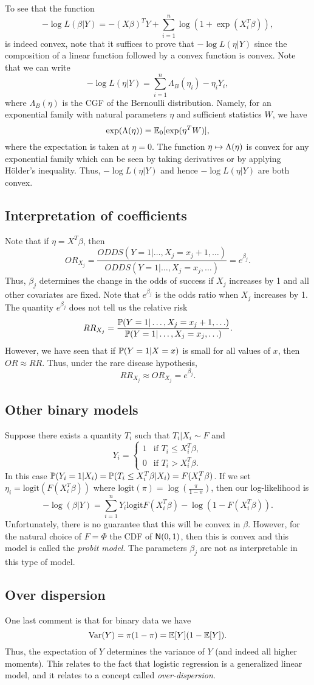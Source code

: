 To see that the function 
\[-\log L(\beta|Y)  = -(X\beta)^TY +\sum_{i=1}^n \log(1+\exp(X_i^T\beta)),\]
is indeed convex, note that it suffices to prove that $-\log L(\eta |Y)$ since the composition of a linear function followed by a convex function is convex. Note that we can write
\[-\log L(\eta|Y) = \sum_{i=1}^n \Lambda_B(\eta_i)-\eta_i Y_i, \]
where $\Lambda_B(\eta)$ is the CGF of the Bernoulli distribution. Namely, for an exponential family with natural parameters $\eta$ and sufficient statistics $W$, we have
\[\exp(\Lambda(\eta)) = {\mathbb{E}}_0[\exp(\eta^T W)], \]
where the expectation is taken at $\eta = 0$. The function $\eta \mapsto \Lambda(\eta)$ is convex for any exponential family which can be seen by taking derivatives or by applying H\"older's inequality. Thus, $-\log L(\eta|Y)$ and hence $-\log L(\eta|Y)$ are both convex.
\subsection{Interpretation of coefficients}
Note that if $\eta = X^T \beta$, then 
\[OR_{X_j} = \frac{ODDS(Y=1|\ldots, X_j = x_j+1,\ldots)}{ODDS(Y=1|\ldots, X_j = x_j,\ldots)} = e^{\beta_j}. \]
Thus, $\beta_j$ determines the change in the odds of success if $X_j$ increases by 1 and all other covariates are fixed. Note that $e^{\beta_j}$ is the odds ratio when $X_j$ increases by 1. The quantity $e^{\beta_j}$ does not tell us the relative risk 
\[RR_{X_j} =\frac{{\mathbb{P}}(Y=1|\ldots, X_j = x_j+1,\ldots)}{{\mathbb{P}}(Y=1|\ldots, X_j = x_j,\ldots)}. \]
However, we have seen that if ${\mathbb{P}}(Y=1|X=x)$ is small for all values of $x$, then $OR \approx RR$. Thus, under the rare disease hypothesis,
\[RR_{X_j} \approx OR_{X_j} = e^{\beta_j}.\]
\subsection{Other binary models}
Suppose there exists a quantity $T_i$ such that $T_i | X_i \sim F$ and 
\[Y_i = \begin{cases}
    1 & \text{if } T_i \le X_i^T \beta,\\
    0 & \text{if } T_i > X_i^T\beta.
\end{cases} \]
In this case ${\mathbb{P}}(Y_i = 1|X_i) = {\mathbb{P}}(T_i \le X_i^T\beta |X_i) = F(X_i^T\beta)$. If we set $\eta_i = \text{logit}(F(X_i^T\beta))$ where $\text{logit}(\pi) =\log\left(\frac{\pi}{1-\pi}\right)$, then our log-likelihood is 
\[-\log(\beta|Y) = \sum_{i=1}^n Y_i \text{logit}F(X_i^T\beta)-\log(1-F(X_i^T\beta)).\]
Unfortunately, there is no guarantee that this will be convex in $\beta$. However, for the natural choice of $F = \Phi$ the CDF of $\mathsf{N}(0,1)$, then this is convex and this model is called the \emph{probit model}. The parameters $\beta_j$ are not as interpretable in this type of model.
\subsection{Over dispersion}
One last comment is that for binary data we have
\[\operatorname{Var}(Y) = \pi(1-\pi) = {\mathbb{E}}[Y](1-{\mathbb{E}}[Y]). \]
Thus, the expectation of $Y$ determines the variance of $Y$ (and indeed all higher moments).  This relates to the fact that logistic regression is a generalized linear model, and it relates to a concept called \emph{over-dispersion}.
